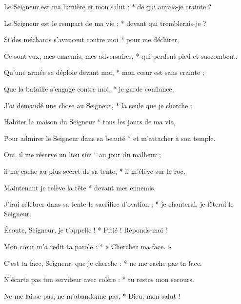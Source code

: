 \item Le Seigneur est ma lumière et mon salut ; * de qui aurais-je crainte ?

\item Le Seigneur est le rempart de ma vie ; * devant qui tremblerais-je ?

\item Si des méchants s'avancent contre moi * pour me déchirer,

\item Ce sont eux, mes ennemis, mes adversaires, * qui perdent pied et succombent.

\item Qu'une armée se déploie devant moi, * mon cœur est sans crainte ;

\item Que la bataille s'engage contre moi, * je garde confiance.

\item J'ai demandé une chose au Seigneur, * la seule que je cherche :

\item Habiter la maison du Seigneur * tous les jours de ma vie,

\item Pour admirer le Seigneur dans sa beauté * et m'attacher à son temple.

\item Oui, il me réserve un lieu sûr * au jour du malheur ;

\item il me cache au plus secret de sa tente, * il m'élève sur le roc.

\item Maintenant je relève la tête * devant mes ennemis.

\item J'irai célébrer dans sa tente le sacrifice d'ovation ; * je chanterai, je fêterai le Seigneur.

\item Écoute, Seigneur, je t'appelle ! * Pitié ! Réponds-moi !

\item Mon cœur m'a redit ta parole : * « Cherchez ma face. »

\item C'est ta face, Seigneur, que je cherche : * ne me cache pas ta face.

\item N'écarte pas ton serviteur avec colère : * tu restes mon secours.

\item Ne me laisse pas, ne m'abandonne pas, * Dieu, mon salut !

